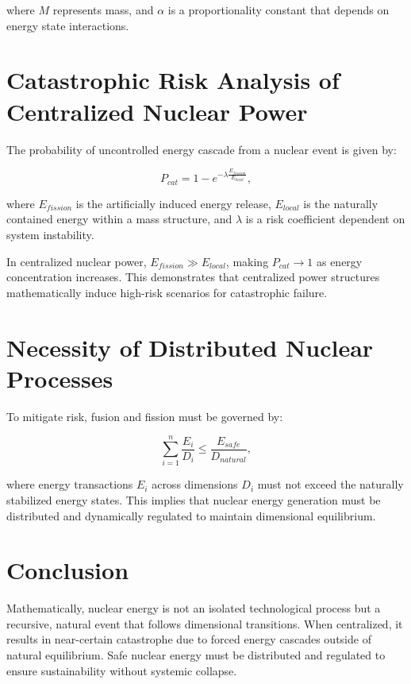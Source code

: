 \documentclass[letterpaper,12pt]{article}
\begin{document}
where $M$ represents mass, and $\alpha$ is a proportionality constant that depends on energy state interactions.

\section{Catastrophic Risk Analysis of Centralized Nuclear Power}
The probability of uncontrolled energy cascade from a nuclear event is given by:

\begin{equation}
    P_{cat} = 1 - e^{-\lambda \frac{E_{fission}}{E_{local}}},
\end{equation}

where $E_{fission}$ is the artificially induced energy release, $E_{local}$ is the naturally contained energy within a mass structure, and $\lambda$ is a risk coefficient dependent on system instability.

In centralized nuclear power, $E_{fission} \gg E_{local}$, making $P_{cat} \to 1$ as energy concentration increases. This demonstrates that centralized power structures mathematically induce high-risk scenarios for catastrophic failure.

\section{Necessity of Distributed Nuclear Processes}
To mitigate risk, fusion and fission must be governed by:

\begin{equation}
    \sum_{i=1}^{n} \frac{E_{i}}{D_{i}} \leq \frac{E_{safe}}{D_{natural}},
\end{equation}

where energy transactions $E_i$ across dimensions $D_i$ must not exceed the naturally stabilized energy states. This implies that nuclear energy generation must be distributed and dynamically regulated to maintain dimensional equilibrium.

\section{Conclusion}
Mathematically, nuclear energy is not an isolated technological process but a recursive, natural event that follows dimensional transitions. When centralized, it results in near-certain catastrophe due to forced energy cascades outside of natural equilibrium. Safe nuclear energy must be distributed and regulated to ensure sustainability without systemic collapse.
\end{document}

